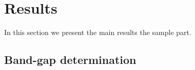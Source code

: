 \section{Results}
\label{sec:results}

In this section we present the main results the sample part.

\subsection{Band-gap determination}


